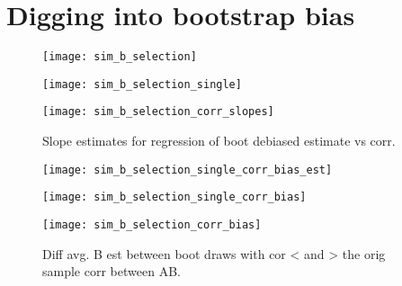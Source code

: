 \section{Digging into bootstrap bias}

\begin{figure}[hbtp]
    \begin{center}
    \texttt{[image: sim\_b\_selection]}
    \caption{\label{Fig:sim_b_selection} }
    \end{center}
\end{figure}

\begin{figure}[hbtp]
    \begin{center}
    \texttt{[image: sim\_b\_selection\_single]}
    \caption{\label{Fig:sim_b_selection_single} }
    \end{center}
\end{figure}
\begin{figure}[hbtp]
    \begin{center}
    \texttt{[image: sim\_b\_selection\_corr\_slopes]}
    \caption{\label{Fig:sim_b_selection_corr_slopes} Slope estimates for regression of boot debiased estimate vs corr. }
    \end{center}
\end{figure}

\begin{figure}[hbtp]
    \begin{center}
    \texttt{[image: sim\_b\_selection\_single\_corr\_bias\_est]}
    \caption{\label{Fig:sim_b_selection_single_corr_bias_est} }
    \end{center}
\end{figure}

\begin{figure}[hbtp]
    \begin{center}
    \texttt{[image: sim\_b\_selection\_single\_corr\_bias]}
    \caption{\label{Fig:sim_b_selection_single_corr_bias}  }
    \end{center}
\end{figure}

\begin{figure}[hbtp]
    \begin{center}
    \texttt{[image: sim\_b\_selection\_corr\_bias]}
    \caption{\label{Fig:sim_b_selection_corr_bias} Diff avg. B est between boot draws with cor < and > the orig sample corr between AB. }
    \end{center}
\end{figure}


